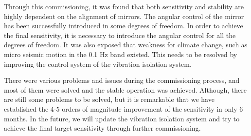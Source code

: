 Through this commissioning, it was found that both sensitivity and stability are highly dependent on the alignment of mirrors. The angular control of the mirror has been successfully introduced in some degrees of freedom. In order to achieve the final sensitivity, it is necessary to introduce the angular control for all the degrees of freedom. It was also exposed that weakness for climate change, such as micro seismic motion in the 0.1 Hz band existed. This needs to be resolved by improving the control system of the vibration isolation system.

There were various problems and issues during the commissioning process, and most of them were solved and the stable operation was achieved. Although, there are still some problems to be solved, but it is remarkable that we have established the 4-5 orders of magnitude improvement of the sensitivity in only 6\,months. In the future, we will update the vibration isolation system and try to achieve the final target sensitivity through further commissioning.



